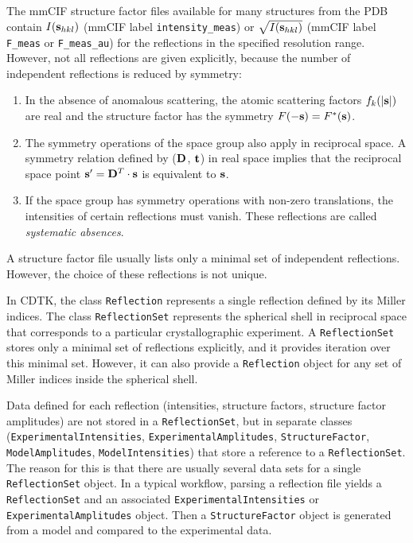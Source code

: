 \documentclass[12pt]{article}
\newcommand{\vect}[1]{{\bf #1}}
\newcommand{\mat}[1]{{\bf #1}}
\newcommand{\vs}{\vect{s}}
\newcommand{\vt}{\vect{t}}
\begin{document}
\begin{sloppy}
The mmCIF structure factor files available for many structures from
the PDB contain $I(\vs_{hkl})$ (mmCIF label \texttt{intensity\_meas})
or $\sqrt{I(\vs_{hkl})}$ (mmCIF label \texttt{F\_meas} or
\texttt{F\_meas\_au}) for the reflections in the specified resolution
range. However, not all reflections are given explicitly, because the
number of independent reflections is reduced by symmetry:
\begin{enumerate}
\item
In the absence of anomalous scattering, the atomic scattering factors
$f_k(|\vs|)$ are real and the structure factor has the symmetry
$F(-\vs) = F^{*}(\vs)$.
\item
The symmetry operations of the space group also apply in reciprocal
space. A symmetry relation defined by ($\mat{D}$, $\vt$) in real space
implies that the reciprocal space point $\vs' = \mat{D}^T\cdot\vs$
is equivalent to $\vs$.
\item
If the space group has symmetry operations with non-zero translations,
the intensities of certain reflections must vanish. These reflections
are called \textit{systematic absences}.
\end{enumerate}
A structure factor file usually lists only a minimal set of
independent reflections. However, the choice of these reflections is
not unique.

\vspace{3mm}

In CDTK, the class \texttt{Reflection} represents a single reflection
defined by its Miller indices. The class \texttt{ReflectionSet}
represents the spherical shell in reciprocal space that corresponds to
a particular crystallographic experiment. A \texttt{ReflectionSet} stores
only a minimal set of reflections explicitly, and it provides iteration
over this minimal set. However, it can also provide a \texttt{Reflection}
object for any set of Miller indices inside the spherical shell.

Data defined for each reflection (intensities, structure factors,
structure factor amplitudes) are not stored in a
\texttt{ReflectionSet}, but in separate classes
(\texttt{ExperimentalIntensities}, \texttt{ExperimentalAmplitudes},
\texttt{StructureFactor}, \texttt{ModelAmplitudes},
\texttt{ModelIntensities}) that store a reference to a
\texttt{ReflectionSet}. The reason for this is that there are usually
several data sets for a single \texttt{ReflectionSet} object. In a
typical workflow, parsing a reflection file yields a
\texttt{ReflectionSet} and an associated
\texttt{ExperimentalIntensities} or \texttt{ExperimentalAmplitudes}
object. Then a \texttt{StructureFactor} object is generated from
a model and compared to the experimental data.


\end{sloppy}
\end{document}
